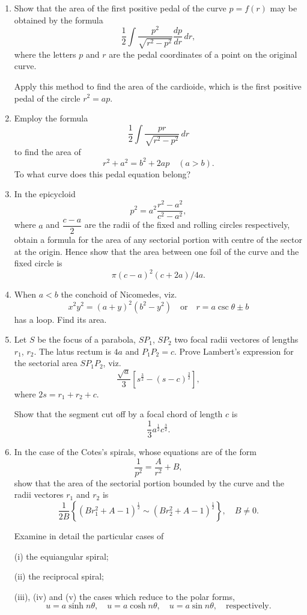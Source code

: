 \documentclass[11pt, a4paper]{article}
\begin{document}
\begin{enumerate}[leftmargin=2em]
\item Show that the area of the first positive pedal of the curve $p=f(r)$ may be obtained by the formula
\[
\frac12\int\frac{p^2}{\sqrt{r^2-p^2}}\frac{dp}{dr}\,dr,
\]
where the letters $p$ and $r$ are the pedal coordinates of a point on the original curve.

Apply this method to find the area of the cardioide, which is the first positive pedal of the circle $r^2=ap$.

\item Employ the formula
\[
\frac12\int\frac{pr}{\sqrt{r^2-p^2}}\,dr
\]
to find the area of
\[
r^2+a^2=b^2+2ap\quad(a>b).
\]
To what curve does this pedal equation belong?

\item In the epicycloid
\[
p^2=a^2\frac{r^2-a^2}{c^2-a^2},
\]
where $a$ and $\dfrac{c-a}{2}$ are the radii of the fixed and rolling circles respectively, obtain a formula for the area of any sectorial portion with centre of the sector at the origin. Hence show that the area between one foil of the curve and the fixed circle is
\[
\pi(c-a)^2(c+2a)/4a.
\]

\item When $a<b$ the conchoid of Nicomedes, viz.
\[
x^2y^2=(a+y)^2(b^2-y^2)\quad\text{or}\quad r=a\csc\theta\pm b
\]
has a loop. Find its area.

\item Let $S$ be the focus of a parabola, $SP_1$, $SP_2$ two focal radii vectores of lengths $r_1$, $r_2$. The latus rectum is $4a$ and $P_1P_2=c$. Prove Lambert's expression for the sectorial area $SP_1P_2$, viz.
\[
\frac{\sqrt a}{3}\left[s^{\frac32}-(s-c)^{\frac32}\right],
\]
where $2s=r_1+r_2+c$.

Show that the segment cut off by a focal chord of length $c$ is
\[
\frac13a^{\frac12}c^{\frac32}.
\]

\item In the case of the Cotes's spirals, whose equations are of the form
\[
\frac{1}{p^2}=\frac{A}{r^2}+B,
\]
show that the area of the sectorial portion bounded by the curve and the radii vectores $r_1$ and $r_2$ is
\[
\frac{1}{2B}\left\{(Br_1^2+A-1)^{\frac12}\sim(Br_2^2+A-1)^{\frac12}\right\},\quad B\neq0.
\]

Examine in detail the particular cases of

(i) the equiangular spiral;

(ii) the reciprocal spiral;

(iii), (iv) and (v) the cases which reduce to the polar forms,
\[
u=a\sinh n\theta,\quad u=a\cosh n\theta,\quad u=a\sin n\theta,\quad\text{respectively.}
\]


\end{enumerate}
\end{document}
